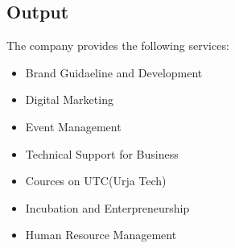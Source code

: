       \subsection{Output}
      The company provides the following services:
      \begin{itemize}
        \item Brand Guidaeline and Development
        \item Digital Marketing
        \item Event Management
        \item Technical Support for Business
        \item Cources on UTC(Urja Tech)
        \item Incubation and Enterpreneurship
        \item Human Resource Management
      \end{itemize}


